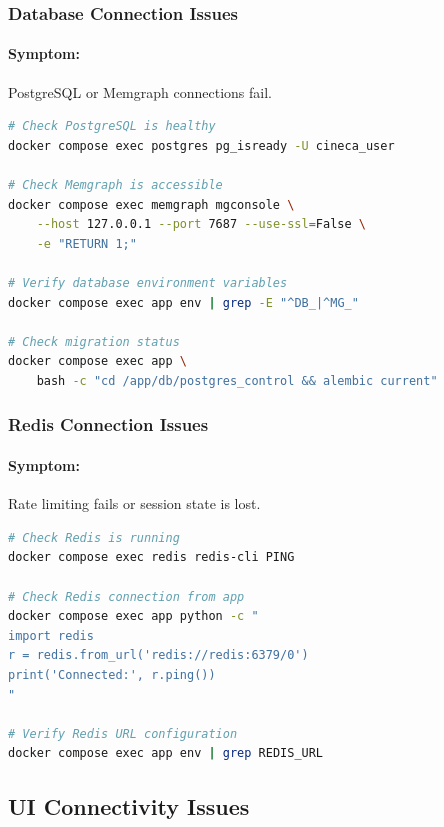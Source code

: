 \subsubsection{Database Connection Issues}

\paragraph{Symptom:} PostgreSQL or Memgraph connections fail.

\begin{lstlisting}[language=bash, caption=Diagnosing database connection issues]
# Check PostgreSQL is healthy
docker compose exec postgres pg_isready -U cineca_user

# Check Memgraph is accessible
docker compose exec memgraph mgconsole \
    --host 127.0.0.1 --port 7687 --use-ssl=False \
    -e "RETURN 1;"

# Verify database environment variables
docker compose exec app env | grep -E "^DB_|^MG_"

# Check migration status
docker compose exec app \
    bash -c "cd /app/db/postgres_control && alembic current"
\end{lstlisting}

\subsubsection{Redis Connection Issues}

\paragraph{Symptom:} Rate limiting fails or session state is lost.

\begin{lstlisting}[language=bash, caption=Diagnosing Redis connection issues]
# Check Redis is running
docker compose exec redis redis-cli PING

# Check Redis connection from app
docker compose exec app python -c "
import redis
r = redis.from_url('redis://redis:6379/0')
print('Connected:', r.ping())
"

# Verify Redis URL configuration
docker compose exec app env | grep REDIS_URL
\end{lstlisting}

\subsection{UI Connectivity Issues}

